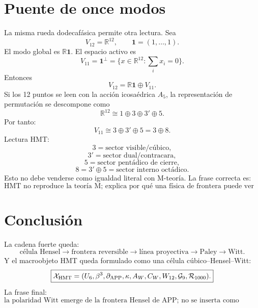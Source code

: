 \documentclass[11pt,a4paper]{article}
\newcommand{\APP}{\operatorname{APP}}
\newcommand{\one}{\mathbf 1}
\begin{document}
\section{Puente de once modos}
La misma rueda dodecafásica permite otra lectura. Sea
\[
V_{12}=\mathbb R^{12},
\qquad
\one=(1,\ldots,1).
\]
El modo global es \(\mathbb R\one\). El espacio activo es
\[
V_{11}=\one^\perp=
\{x\in\mathbb R^{12}:\sum_i x_i=0\}.
\]
Entonces
\[
\boxed{V_{12}=\mathbb R\one\oplus V_{11}.}
\]
Si los 12 puntos se leen con la acción icosaédrica \(A_5\), la representación de permutación se descompone como
\[
\boxed{\mathbb R^{12}\cong1\oplus3\oplus3'\oplus5.}
\]
Por tanto:
\[
\boxed{V_{11}\cong3\oplus3'\oplus5=3\oplus8.}
\]
Lectura HMT:
\[
3=\text{sector visible/cúbico},
\]
\[
3'=\text{sector dual/contracara},
\]
\[
5=\text{sector pentádico de cierre},
\]
\[
8=3'\oplus5=\text{sector interno octádico}.
\]
Esto no debe venderse como igualdad literal con M-teoría. La frase correcta es:
\[
\boxed{\text{HMT no reproduce la teoría M; explica por qué una física de frontera puede ver once modos activos.}}
\]

\section{Conclusión}
La cadena fuerte queda:
\[
\boxed{\text{célula Hensel}\to\text{frontera reversible}\to\text{línea proyectiva}\to\text{Paley}\to\text{Witt}.}
\]
Y el macroobjeto HMT queda formulado como una célula cúbico--Hensel--Witt:
\[
\boxed{
\mathcal X_{\rm HMT}=(U_6,\beta^3,\partial_{\APP},\kappa,A_W,C_W,W_{12},\mathcal G_9,\mathcal R_{1000}).
}
\]
La frase final:
\[
\boxed{\text{la polaridad Witt emerge de la frontera Hensel de APP; no se inserta como matriz arbitraria.}}
\]
\end{document}
